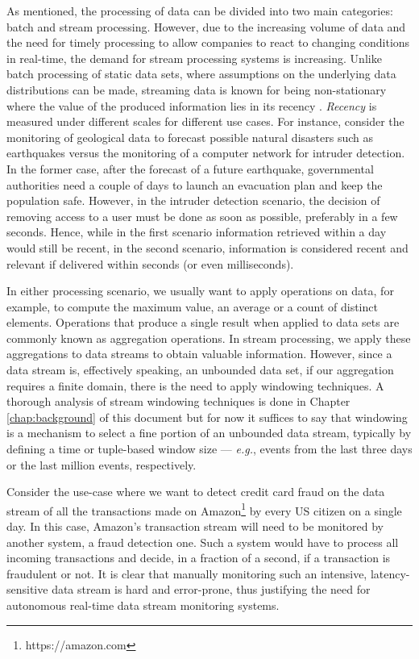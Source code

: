 As mentioned, the processing of data can be divided into two main categories: batch and stream processing. However, due to the increasing volume of data and the need for timely processing to allow companies to react to changing conditions in real-time, the demand for stream processing systems is increasing. Unlike batch processing of static data sets, where assumptions on the underlying data distributions can be made, streaming data is known for being non-stationary \cite{Gama-Knowledge-Discovery} where the value of the produced information lies in its recency \cite{Kolajo-Big-data-stream-SLR}. \textit{Recency} is measured under different scales for different use cases. For instance, consider the monitoring of geological data to forecast possible natural disasters such as earthquakes versus the monitoring of a computer network for intruder detection. In the former case, after the forecast of a future earthquake, governmental authorities need a couple of days to launch an evacuation plan and keep the population safe. However, in the intruder detection scenario, the decision of removing access to a user must be done as soon as possible, preferably in a few seconds. Hence, while in the first scenario information retrieved within a day would still be recent, in the second scenario, information is considered recent and relevant if delivered within seconds (or even milliseconds).

In either processing scenario, we usually want to apply operations on data, for example, to compute the maximum value, an average or a count of distinct elements. Operations that produce a single result when applied to data sets are commonly known as aggregation operations. In stream processing, we apply these aggregations to data streams to obtain valuable information. However, since a data stream is, effectively speaking, an unbounded data set, if our aggregation requires a finite domain, there is the need to apply windowing techniques. A thorough analysis of stream windowing techniques is done in Chapter \ref{chap:background} of this document but for now it suffices to say that windowing is a mechanism to select a fine portion of an unbounded data stream, typically by defining a time or tuple-based window size --- \textit{e.g.}, events from the last three days or the last million events, respectively.

Consider the use-case where we want to detect credit card fraud on the data stream of all the transactions made on Amazon\footnote{https://amazon.com} by every US citizen on a single day. In this case, Amazon's transaction stream will need to be monitored by another system, a fraud detection one. Such a system would have to process all incoming transactions and decide, in a fraction of a second, if a transaction is fraudulent or not. It is clear that manually monitoring such an intensive, latency-sensitive data stream is hard and error-prone, thus justifying the need for autonomous real-time data stream monitoring systems.

